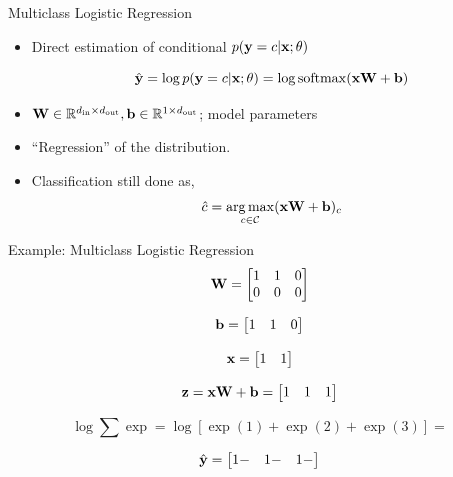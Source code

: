 \documentclass{beamer}
\begin{document}
\begin{frame}{Multiclass Logistic Regression}
  \begin{itemize}
  \item Direct estimation of conditional $p(\mathbf{y} =c | \mathbf{x}; \theta)$
  
    \[\hat{\boldy} = \log p(\boldy =c | \boldx; \theta) =  \log \softmax(\boldx \boldW + \boldb) \] 
  \item $\mathbf{W} \in \mathbb{R}^{{d_{\mathrm{in}}} \times {d_{\mathrm{out}}}}, \mathbf{b} \in \mathbb{R}^{1 \times {d_{\mathrm{out}}}}$; model parameters

  \item ``Regression'' of the distribution.
  \item Classification still done as,
    \[ \hat{c} =  \argmax_{c \in \mcC} (\boldx \boldW + \boldb)_c  \]

  \end{itemize}





\end{frame}

\begin{frame}{Example: Multiclass Logistic Regression}
  \[ \mathbf{W} = \begin{bmatrix} 1  & 1 & 0 \\ 0 & 0 & 0 \\ \end{bmatrix} \]

  \[ \mathbf{b} = \begin{bmatrix} 1  & 1  & 0\\ \end{bmatrix} \]
  
  \[ \mathbf{x} = \begin{bmatrix} 1  & 1 \\ \end{bmatrix} \]

  \[ \mathbf{z} = \mathbf{x} \mathbf{W} + \mathbf{b} = \begin{bmatrix} 1 & 1 & 1 \\ \end{bmatrix} \]

  \[ \log \sum \exp = \log [ \exp(1)  +  \exp(2) + \exp(3) ] =  \] 

  \[ \hat{\mathbf{y}} = \begin{bmatrix}  1 -   &  1- & 1- \\ \end{bmatrix}  \] 


\end{frame}
\end{document}
